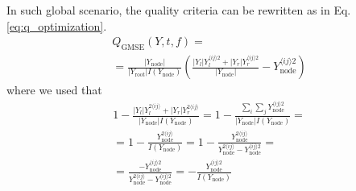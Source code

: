 \documentclass[conference]{IEEEtran}
\newcommand{\mel}[1]{^{\langle #1 \rangle}}
\newcommand{\angled}[1]{\langle #1 \rangle}
\newcommand{\avg}[1]{\left\langle#1\right\rangle}
\begin{document}
In such global scenario, the quality criteria can be rewritten as in Eq. \ref{eq:q_optimization}.
%
\begin{multline}
    Q_\text{GMSE}(Y, t, f)
        =\\
            =\frac{|Y_\text{node}|}{|Y_\text{root}|I(Y_\text{node})}
            \left(
                \frac{
                    |Y_l|Y_l^{\angled{ij}2} + |Y_r|Y_r^{\angled{ij}2}
                }
                    {|Y_\text{node}|}
            - Y_\text{node}^{\angled{ij}2}
            \right)
    \label{eq:q_optimization}
\end{multline}
where we used that
\begin{multline*}
            1-\frac{|Y_l| Y_l^{2\angled{ij}} + |Y_r|Y_r^{2\angled{ij}}}
                {|Y_\text{node}|I(Y_\text{node})}
            =1-\frac{\sum_i \sum_j Y_\text{node}^{\angled{ij}2}}
                {|Y_\text{node}|I(Y_\text{node})}=\\
            =1-\frac{Y_\text{node}^{2\angled{ij}}}
                {I(Y_\text{node})}
            =1-\frac{Y_\text{node}^{2\angled{ij}}}
                {Y_\text{node}^{2\angled{ij}}-Y_\text{node}^{\angled{ij}2}}=\\
            =\frac{-Y_\text{node}^{\angled{ij}2}}
                {Y_\text{node}^{2\angled{ij}}-Y_\text{node}^{\angled{ij}2}}
            =-\frac{Y_\text{node}^{\angled{ij}2}}
                {I(Y_\text{node})}
\end{multline*}
\end{document}
